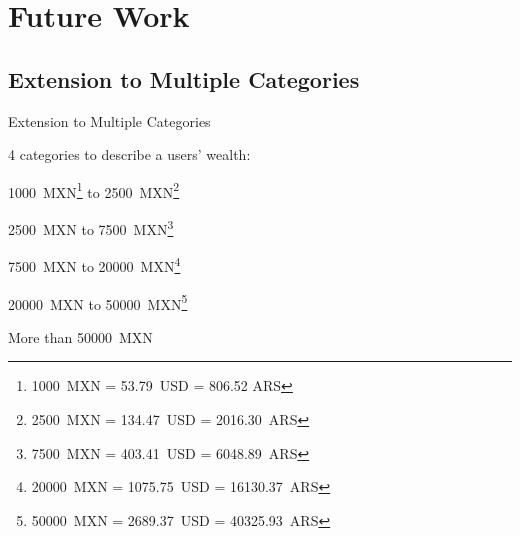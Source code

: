 \documentclass{beamer}
\begin{document}
\section{Future Work}
\subsection{Extension to Multiple Categories}

\begin{frame}{Extension to Multiple Categories}

4 categories to describe a users' wealth:

\begin{description}[leftmargin=!]
	\item[\(R_1\)] \num{1000}~MXN\footnote{\num{1000}~MXN = \num{53.79}~USD = \num{806.52} ARS} to \num{2500}~MXN\footnote{\num{2500}~MXN = \num{134.47}~USD = \num{2016.30}~ARS}
	\item[\(R_2\)] \num{2500}~MXN to \num{7500}~MXN\footnote{\num{7500}~MXN = \num{403.41}~USD = \num{6048.89}~ARS}
	\item[\(R_3\)] \num{7500}~MXN to \num{20000}~MXN\footnote{\num{20000}~MXN = \num{1075.75}~USD = \num{16130.37}~ARS}
	\item[\(R_4\)] \num{20000}~MXN to \num{50000}~MXN\footnote{\num{50000}~MXN = \num{2689.37}~USD = \num{40325.93}~ARS}
	\item[\(R_5\)] More than \num{50000}~MXN
\end{description}

\end{frame}
\end{document}
